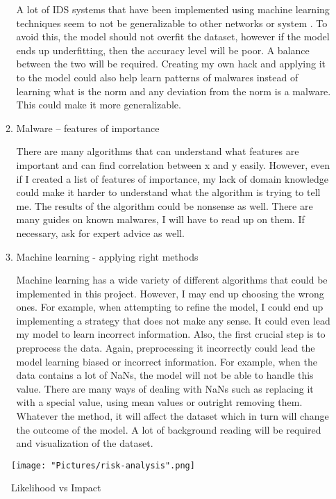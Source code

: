 \documentclass[11pt]{article}
\begin{document}
\begin{enumerate}
\begin{enumerate}
    A lot of IDS systems that have been implemented using machine learning techniques seem to not be generalizable to other networks or system \cite{methodology-general}. To avoid this, the model should not overfit the dataset, however if the model ends up underfitting, then the accuracy level will be poor. A balance between the two will be required. 
Creating my own hack and applying it to the model could also help learn patterns of malwares instead of learning what is the norm and any deviation from the norm is a malware. This could make it more generalizable.

    \item{Malware – features of importance}

    There are many algorithms that can understand what features are important and can find correlation between x and y easily. However, even if I created a list of features of importance, my lack of domain knowledge could make it harder to understand what the algorithm is trying to tell me. The results of the algorithm could be nonsense as well. There are many guides on known malwares, I will have to read up on them. If necessary, ask for expert advice as well.
  
    \item{Machine learning - applying right methods}

    Machine learning has a wide variety of different algorithms that could be implemented in this project. However, I may end up choosing the wrong ones. For example, when attempting to refine the model, I could end up implementing a strategy that does not make any sense. It could even lead my model to learn incorrect information.
Also, the first crucial step is to preprocess the data. Again, preprocessing it incorrectly could lead the model learning biased or incorrect information. For example, when the data contains a lot of NaNs, the model will not be able to handle this value. There are many ways of dealing with NaNs such as replacing it with a special value, using mean values or outright removing them. Whatever the method, it will affect the dataset which in turn will change the outcome of the model. A lot of background reading will be required and visualization of the dataset.
  \end{enumerate}
\end{enumerate}

\begin{figure}[h!]
   \texttt{[image: "Pictures/risk-analysis".png]}
   \caption{Likelihood vs Impact}
   \label{fig:risk-analysis}
\end{figure}
\end{document}
